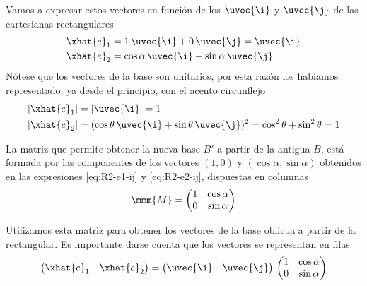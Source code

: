 Vamos a expresar estos vectores en función de los $\uvec{\i}$ y $\uvec{\j}$ de las
cartesianas rectangulares
\begin{align}
  \label{eq:R2-e1-ij}
  \xhat{e}_1 &= 1\,\uvec{\i} + 0\,\uvec{\j} = \uvec{\i}\\
  \label{eq:R2-e2-ij}
  \xhat{e}_2 &= \cos{\alpha}\, \uvec{\i} + \sin{\alpha}\, \uvec{\j}
\end{align}
Nótese que los vectores de la base son unitarios, por esta razón los habíamos
representado, ya desde el principio, con el acento circunflejo
\begin{align}
  |\xhat{e}_1|
  &=
    |\uvec{\i}| = 1\\
  |\xhat{e}_2|
  &=
    (\cos\theta\,\uvec{\i}+\sin\theta\,\uvec{\j})^2
    = \cos^2\theta + \sin^2\theta = 1
\end{align}

La matriz que permite obtener la nueva base $B'$ a partir de la antigua $B$, está formada
por las componentes de los vectores $(1,0)$ y $(\cos\alpha,\sin\alpha)$ obtenidos en las
expresiones \eqref{eq:R2-e1-ij} y \eqref{eq:R2-e2-ij}, dispuestas en columnas
\[
  \mmm{M}
  =
  \begin{pmatrix}
    1 & \cos\alpha\\
    0 & \sin\alpha
  \end{pmatrix}
\]

Utilizamos esta matriz para obtener los vectores de la base oblícua a partir de la
rectangular. Es importante darse cuenta que los vectores se representan en filas
\[
  \begin{pmatrix}
    \xhat{e}_1 &  \xhat{e}_2
  \end{pmatrix}
  =
  \begin{pmatrix}
    \uvec{\i} & \uvec{\j}
  \end{pmatrix}
  \,
  \begin{pmatrix}
    1 & \cos\alpha\\
    0 & \sin\alpha
  \end{pmatrix}
\]

